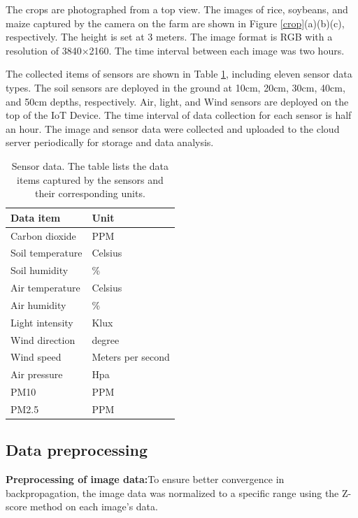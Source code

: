 \documentclass[acmsmall,manuscript, screen, review]{acmart}
\begin{document}
The crops are photographed from a top view. The images of rice, soybeans, and maize captured by the camera on the farm are shown in Figure \ref{crop}(a)(b)(c), respectively. The height is set at 3 meters. The image format is RGB with a resolution of 3840×2160. The time interval between each image was two hours.


The collected items of sensors are shown in Table \ref{tab:sensor_and_data_items}, including eleven sensor data types. The soil sensors are deployed in the ground at 10cm, 20cm, 30cm, 40cm, and 50cm depths, respectively. Air, light, and Wind sensors are deployed on the top of the IoT Device. The time interval of data collection for each sensor is half an hour. The image and sensor data were collected and uploaded to the cloud server periodically for storage and data analysis.



\begin{table}
  \caption{Sensor data. The table lists the data items captured by the sensors and their corresponding units.}
  \label{tab:sensor_and_data_items}
  \begin{tabular}{ll}
    \hline
    Data item        & Unit              \\
    \hline
    Carbon dioxide   & PPM               \\
    Soil temperature & Celsius           \\
    Soil humidity    & \%                \\
    Air temperature  & Celsius           \\
    Air humidity     & \%                \\
    Light intensity  & Klux              \\
    Wind direction   & degree            \\
    Wind speed       & Meters per second \\
    Air pressure     & Hpa               \\
    PM10             & PPM               \\
    PM2.5            & PPM               \\
    \hline
  \end{tabular}%
\end{table}

\subsection{Data preprocessing}
\textbf{Preprocessing of image data:}To ensure better convergence in backpropagation, the image data was normalized to a specific range using the Z-score method on each image's data.
\end{document}

